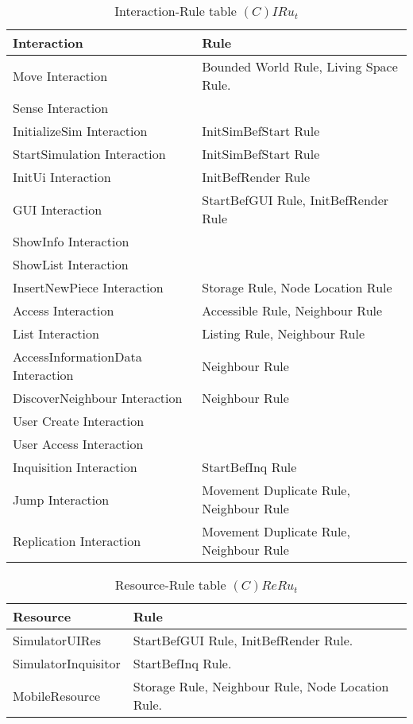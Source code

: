 \begin{table}[H]
	\centering
	\begin{tabular}{|p{4cm}|p{8cm}|}
			\hline
			\textbf{Interaction} & \textbf{Rule} \\
			\hline
			Move Interaction & Bounded World Rule, Living Space Rule. \\
			\hline
			Sense Interaction & \\
			\hline
			InitializeSim Interaction & InitSimBefStart Rule \\
			\hline
			StartSimulation Interaction & InitSimBefStart Rule \\
			\hline
			InitUi Interaction & InitBefRender Rule \\
			\hline
			GUI Interaction & StartBefGUI Rule, InitBefRender Rule\\
			\hline
			ShowInfo Interaction & \\
			\hline
			ShowList Interaction & \\
			\hline
			InsertNewPiece Interaction & Storage Rule, Node Location Rule \\
			\hline
			Access Interaction & Accessible Rule, Neighbour Rule \\
			\hline
			List Interaction & Listing Rule, Neighbour Rule \\
			\hline
			AccessInformationData Interaction & Neighbour Rule\\
			\hline
			DiscoverNeighbour Interaction & Neighbour Rule\\
			\hline
			User Create Interaction & \\
			\hline
			User Access Interaction & \\
			\hline
			Inquisition Interaction & StartBefInq Rule \\
			\hline
			Jump Interaction & Movement Duplicate Rule, Neighbour Rule \\
			\hline
			Replication Interaction & Movement Duplicate Rule, Neighbour Rule \\
			\hline
		\end{tabular}
	\caption{Interaction-Rule table $(C)IRu_t$}
	\label{tab:cirut}
\end{table}

\begin{table}[H]
	\centering
	\begin{tabular}{|p{4cm}|p{8cm}|}
			\hline
			\textbf{Resource} & \textbf{Rule} \\
			\hline
			SimulatorUIRes & StartBefGUI Rule, InitBefRender Rule. \\
			\hline
			SimulatorInquisitor & StartBefInq Rule. \\
			\hline
			MobileResource & Storage Rule, Neighbour Rule, Node Location Rule. \\
			\hline
		\end{tabular}
	\caption{Resource-Rule table $(C)ReRu_t$}
	\label{tab:crerut}
\end{table}

